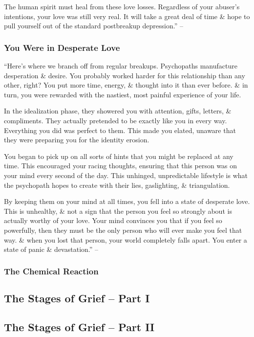 \documentclass{article}
\numberwithin{equation}{section}
\begin{document}
The human spirit must heal from these love losses. Regardless of your abuser's intentions, your love was still very real. It will take a great deal of time \& hope to pull yourself out of the standard postbreakup depression.'' -- \cite[p. 88]{MacKenzie2015}

\subsubsection{You Were in Desperate Love}
``Here's where we branch off from regular breakups. Psychopaths manufacture desperation \& desire. You probably worked harder for this relationship than any other, right? You put more time, energy, \& thought into it than ever before. \& in turn, you were rewarded with the nastiest, most painful experience of your life.

In the idealization phase, they showered you with attention, gifts, letters, \& compliments. They actually pretended to be exactly like you in every way. Everything you did was perfect to them. This made you elated, unaware that they were preparing you for the identity erosion.

You began to pick up on all sorts of hints that you might be replaced at any time. This encouraged your racing thoughts, ensuring that this person was on your mind every second of the day. This unhinged, unpredictable lifestyle is what the psychopath hopes to create with their lies, gaslighting, \& triangulation.

By keeping them on your mind at all times, you fell into a state of desperate love. This is unhealthy, \& not a sign that the person you feel so strongly about is actually worthy of your love. Your mind convinces you that if you feel so powerfully, then they must be the only person who will ever make you feel that way. \& when you lost that person, your world completely falls apart. You enter a state of panic \& devastation.'' -- \cite[pp. 88--89]{MacKenzie2015}

\subsubsection{The Chemical Reaction}

\subsection{The Stages of Grief -- Part I}

\subsection{The Stages of Grief -- Part II}
\end{document}
